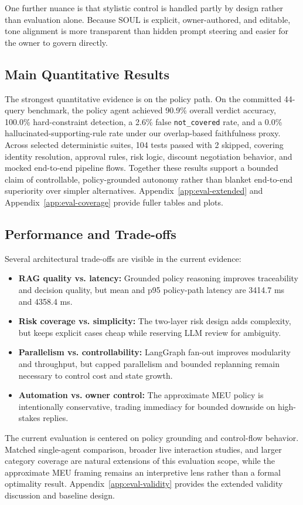 \documentclass[11pt]{article}
\begin{document}
One further nuance is that stylistic control is handled partly by design rather than evaluation alone. Because SOUL is explicit, owner-authored, and editable, tone alignment is more transparent than hidden prompt steering and easier for the owner to govern directly.

\subsection{Main Quantitative Results}

The strongest quantitative evidence is on the policy path. On the committed 44-query benchmark, the policy agent achieved 90.9\% overall verdict accuracy, 100.0\% hard-constraint detection, a 2.6\% false \texttt{not\_covered} rate, and a 0.0\% hallucinated-supporting-rule rate under our overlap-based faithfulness proxy. Across selected deterministic suites, 104 tests passed with 2 skipped, covering identity resolution, approval rules, risk logic, discount negotiation behavior, and mocked end-to-end pipeline flows. Together these results support a bounded claim of controllable, policy-grounded autonomy rather than blanket end-to-end superiority over simpler alternatives. Appendix~\ref{app:eval-extended} and Appendix~\ref{app:eval-coverage} provide fuller tables and plots.

\subsection{Performance and Trade-offs}

Several architectural trade-offs are visible in the current evidence:
\begin{itemize}\itemsep0.15em  \topsep0.25em 
\item \textbf{RAG quality vs. latency:} Grounded policy reasoning improves traceability and decision quality, but mean and p95 policy-path latency are 3414.7 ms and 4358.4 ms.
\item \textbf{Risk coverage vs. simplicity:} The two-layer risk design adds complexity, but keeps explicit cases cheap while reserving LLM review for ambiguity.
\item \textbf{Parallelism vs. controllability:} LangGraph fan-out improves modularity and throughput, but capped parallelism and bounded replanning remain necessary to control cost and state growth.
\item \textbf{Automation vs. owner control:} The approximate MEU policy is intentionally conservative, trading immediacy for bounded downside on high-stakes replies.
\end{itemize}
\noindent
The current evaluation is centered on policy grounding and control-flow behavior. Matched single-agent comparison, broader live interaction studies, and larger category coverage are natural extensions of this evaluation scope, while the approximate MEU framing remains an interpretive lens rather than a formal optimality result. Appendix~\ref{app:eval-validity} provides the extended validity discussion and baseline design.
\end{document}
